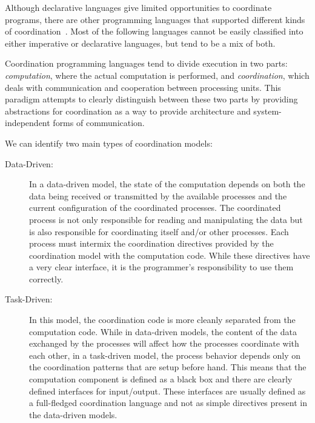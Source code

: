 Although declarative languages give limited opportunities to coordinate
programs, there are other programming languages that supported different kinds
of coordination~\cite{Papadopoulos98coordinationmodels}. Most of the following
languages cannot be easily classified into either imperative or declarative
languages, but tend to be a mix of both.

Coordination programming languages tend to divide execution in two parts:
\emph{computation}, where the actual computation is performed, and
\emph{coordination}, which deals with communication and cooperation between
processing units. This paradigm attempts to clearly distinguish between these
two parts by providing abstractions for coordination as a way to provide
architecture and system-independent forms of communication.

We can identify two main types of coordination models:

\begin{description}
   \item[Data-Driven:]
   
   In a data-driven model, the state of the computation depends on both the data
   being received or transmitted by the available processes and the current configuration
   of the coordinated processes. The coordinated process is not only responsible
   for reading and manipulating the data but is also responsible for
   coordinating itself and/or other processes. Each process must intermix the
   coordination directives provided by the coordination model with the
   computation code. While these directives have a very clear interface, it is
   the programmer's responsibility to use them correctly.

   \item[Task-Driven:]
   
   In this model, the coordination code is more cleanly separated from the
   computation code. While in data-driven models, the content of the data
   exchanged by the processes will affect how the processes coordinate with each
   other, in a task-driven model, the process behavior depends only on the
   coordination patterns that are setup before hand. This means that the
   computation component is defined as a black box and there are clearly defined
   interfaces for input/output. These interfaces are usually defined as a
   full-fledged coordination language and not as simple directives present in
   the data-driven models.  \end{description}

